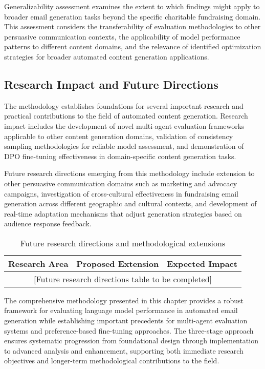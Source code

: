 Generalizability assessment examines the extent to which findings might apply to broader email generation tasks beyond the specific charitable fundraising domain. This assessment considers the transferability of evaluation methodologies to other persuasive communication contexts, the applicability of model performance patterns to different content domains, and the relevance of identified optimization strategies for broader automated content generation applications.

\subsection{Research Impact and Future Directions}

The methodology establishes foundations for several important research and practical contributions to the field of automated content generation. Research impact includes the development of novel multi-agent evaluation frameworks applicable to other content generation domains, validation of consistency sampling methodologies for reliable model assessment, and demonstration of DPO fine-tuning effectiveness in domain-specific content generation tasks.

Future research directions emerging from this methodology include extension to other persuasive communication domains such as marketing and advocacy campaigns, investigation of cross-cultural effectiveness in fundraising email generation across different geographic and cultural contexts, and development of real-time adaptation mechanisms that adjust generation strategies based on audience response feedback.

\begin{table}[htbp]
    \centering
    \caption{Future research directions and methodological extensions}
    \label{tab:future-research}
    \begin{tabular}{|l|l|l|}
    \hline
    \textbf{Research Area} & \textbf{Proposed Extension} & \textbf{Expected Impact} \\
    \hline
    \multicolumn{3}{|c|}{[Future research directions table to be completed]} \\
    \hline
    \end{tabular}
\end{table}

The comprehensive methodology presented in this chapter provides a robust framework for evaluating language model performance in automated email generation while establishing important precedents for multi-agent evaluation systems and preference-based fine-tuning approaches. The three-stage approach ensures systematic progression from foundational design through implementation to advanced analysis and enhancement, supporting both immediate research objectives and longer-term methodological contributions to the field.